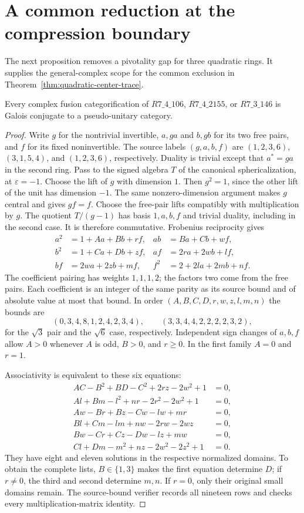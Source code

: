 \section{A common reduction at the compression boundary}
\label{sec:three-case-galois-pu}
The next proposition removes a pivotality gap for three quadratic rings.
It supplies the general-complex scope for the common exclusion in
Theorem~\ref{thm:quadratic-center-trace}.

\begin{proposition}\label{prop:three-case-galois-pu}
Every complex fusion categorification of $R7\_4\_106$,
$R7\_4\_2155$, or $R7\_3\_146$ is Galois conjugate to a
pseudo-unitary category.
\end{proposition}
\begin{proof}
Write $g$ for the nontrivial invertible, $a,ga$ and $b,gb$ for its
two free pairs, and $f$ for its fixed noninvertible. The source labels
$(g,a,b,f)$ are $(1,2,3,6)$, $(3,1,5,4)$, and $(1,2,3,6)$,
respectively. Duality is trivial except that $a^*=ga$ in the second ring.
Pass to the signed algebra $T$ of the canonical sphericalization,
at $\varepsilon=-1$. Choose the lift of $g$ with dimension $1$.
Then $g^2=1$, since the other lift of the unit has dimension $-1$.
The same nonzero-dimension argument makes $g$ central and gives
$gf=f$. Choose the free-pair lifts compatibly with multiplication
by $g$. The quotient $T/(g-1)$ has basis $1,a,b,f$ and trivial
duality, including in the second case. It is therefore commutative.
Frobenius reciprocity gives
\begin{align*}
 a^2&=1+Aa+Bb+rf,&ab&=Ba+Cb+wf,\\
 b^2&=1+Ca+Db+zf,&af&=2ra+2wb+lf,\\
 bf&=2wa+2zb+mf,&f^2&=2+2la+2mb+nf.
\end{align*}
The coefficient pairing has weights $1,1,1,2$; the factors two
come from the free pairs. Each coefficient is an integer of the
same parity as its source bound and of absolute value at most that
bound. In order $(A,B,C,D,r,w,z,l,m,n)$ the bounds are
\[
 (0,3,4,8,1,2,4,2,3,4),\qquad
 (3,3,4,4,2,2,2,2,3,2),
\]
for the $\sqrt3$ pair and the $\sqrt6$ case, respectively. Independent
sign changes of $a,b,f$ allow $A>0$ whenever $A$ is odd, $B>0$,
and $r\geq0$. In the first family $A=0$ and $r=1$.

Associativity is equivalent to these six equations:
\begin{align*}
 AC-B^2+BD-C^2+2rz-2w^2+1&=0,\\
 Al+Bm-l^2+nr-2r^2-2w^2+1&=0,\\
 Aw-Br+Bz-Cw-lw+mr&=0,\\
 Bl+Cm-lm+nw-2rw-2wz&=0,\\
 Bw-Cr+Cz-Dw-lz+mw&=0,\\
 Cl+Dm-m^2+nz-2w^2-2z^2+1&=0.
\end{align*}
They have eight and eleven solutions in the respective normalized
domains. To obtain the complete lists, $B\in\{1,3\}$ makes the
first equation determine $D$; if $r\ne0$, the third and second
determine $m,n$. If $r=0$, only their original small domains remain.
The source-bound verifier records all nineteen rows and checks every
multiplication-matrix identity.


\end{proof}
